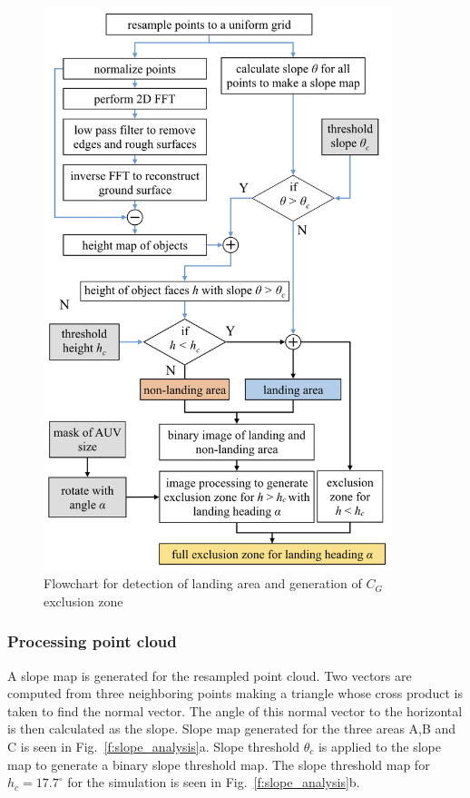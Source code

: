 \begin{figure}[!ht]
\centering
\includegraphics[width=4in]{./images/mehul14.png}
\caption{Flowchart for detection of landing area and generation of $C_G$ exclusion zone}
\label{f:mehul14}
\end{figure}

\subsubsection{Processing point cloud}


A slope map is generated for the resampled point cloud. Two vectors are computed from three neighboring points making a triangle whose cross product is taken to find the normal vector. The angle of this normal vector to the horizontal is then calculated as the slope. Slope map generated for the three areas A,B and C is seen in Fig.~\ref{f:slope_analysis}a. Slope threshold $\theta_c$ is applied to the slope map to generate a binary slope threshold map. The slope threshold map for $h_c = 17.7^\circ$ for the simulation is seen in Fig.~\ref{f:slope_analysis}b.


